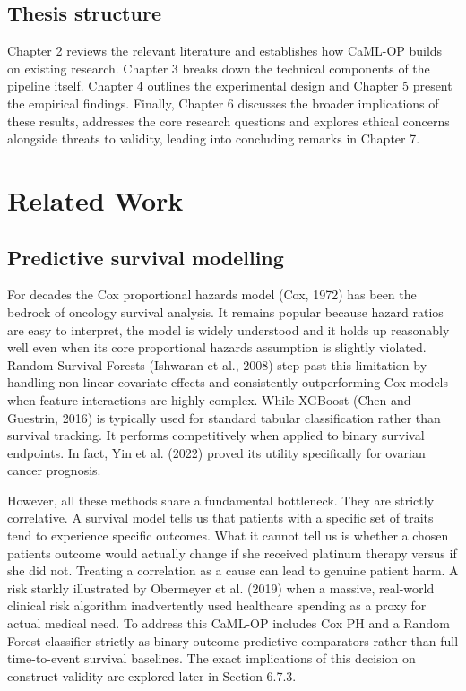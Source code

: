 \section{Thesis structure}\label{thesis-structure}

Chapter 2 reviews the relevant literature and establishes how CaML-OP builds on existing research. Chapter 3 breaks down the technical components of the pipeline itself. Chapter 4 outlines the experimental design and Chapter 5 present the empirical findings. Finally, Chapter 6 discusses the broader implications of these results, addresses the core research questions and explores ethical concerns alongside threats to validity, leading into concluding remarks in Chapter 7.

\chapter{Related Work}\label{related-work}

\section{Predictive survival modelling}\label{predictive-survival-modelling}

For decades the Cox proportional hazards model (Cox, 1972) has been the bedrock of oncology survival analysis. It remains popular because hazard ratios are easy to interpret, the model is widely understood and it holds up reasonably well even when its core proportional hazards assumption is slightly violated. Random Survival Forests (Ishwaran et al., 2008) step past this limitation by handling non-linear covariate effects and consistently outperforming Cox models when feature interactions are highly complex. While XGBoost (Chen and Guestrin, 2016) is typically used for standard tabular classification rather than survival tracking. It performs competitively when applied to binary survival endpoints. In fact, Yin et al. (2022) proved its utility specifically for ovarian cancer prognosis.

However, all these methods share a fundamental bottleneck. They are strictly correlative. A survival model tells us that patients with a specific set of traits tend to experience specific outcomes. What it cannot tell us is whether a chosen patient\textquotesingle s outcome would actually change if she received platinum therapy versus if she did not. Treating a correlation as a cause can lead to genuine patient harm. A risk starkly illustrated by Obermeyer et al. (2019) when a massive, real-world clinical risk algorithm inadvertently used healthcare spending as a proxy for actual medical need. To address this CaML-OP includes Cox PH and a Random Forest classifier strictly as binary-outcome predictive comparators rather than full time-to-event survival baselines. The exact implications of this decision on construct validity are explored later in Section 6.7.3.

